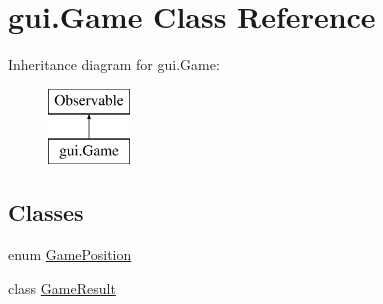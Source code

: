\hypertarget{classgui_1_1_game}{}\section{gui.\+Game Class Reference}
\label{classgui_1_1_game}
Inheritance diagram for gui.\+Game\+:\begin{figure}[H]
\begin{center}
\leavevmode
\includegraphics[height=2.000000cm]{classgui_1_1_game}
\end{center}
\end{figure}
\subsection*{Classes}
\begin{DoxyCompactItemize}
\item 
enum \mbox{\hyperlink{enumgui_1_1_game_1_1_game_position}{Game\+Position}}
\item 
class \mbox{\hyperlink{classgui_1_1_game_1_1_game_result}{Game\+Result}}
\end{DoxyCompactItemize}
